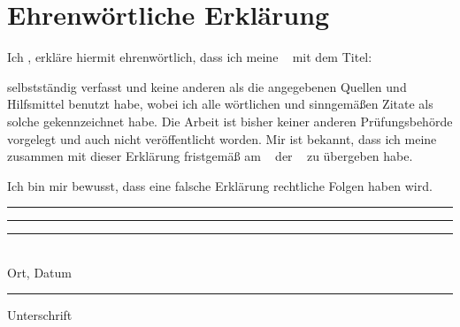 \chapter{Ehrenwörtliche Erklärung}
\thispagestyle{fancy}

Ich \writer, erkläre hiermit ehrenwörtlich, dass ich meine {\worktitle\ } mit dem Titel:
\vspace{\baselineskip}
\begin{center}
    \textbf{\grqq{}\FullTitle\grqq{}}
\end{center}
\vspace{\baselineskip}
selbstständig verfasst und keine anderen als die angegebenen Quellen und Hilfsmittel
benutzt habe, wobei ich alle wörtlichen und sinngemäßen Zitate als solche gekennzeichnet
habe. Die Arbeit ist bisher keiner anderen Prüfungsbehörde vorgelegt und auch nicht
veröffentlicht worden.
Mir ist bekannt, dass ich meine {\worktitle\ } zusammen mit dieser Erklärung fristgemäß
am {\MyDate\ } der {\school\ } zu übergeben habe.

\vspace{\baselineskip}
\vspace{\baselineskip}
\vspace{\baselineskip}


Ich bin mir bewusst, dass eine falsche Erklärung rechtliche Folgen haben wird.

\vspace{\baselineskip}
\vspace{\baselineskip}
\vspace{\baselineskip}
\vspace{\baselineskip}
\vspace{\baselineskip}
\vspace{\baselineskip}


\noindent\rule{150pt}{1pt}\textcolor{white}{\noindent\rule{150pt}{1pt}}\noindent\rule{150pt}{1pt}\\
Ort, Datum\textcolor{white}{\noindent\rule{240pt}{1pt}}Unterschrift
